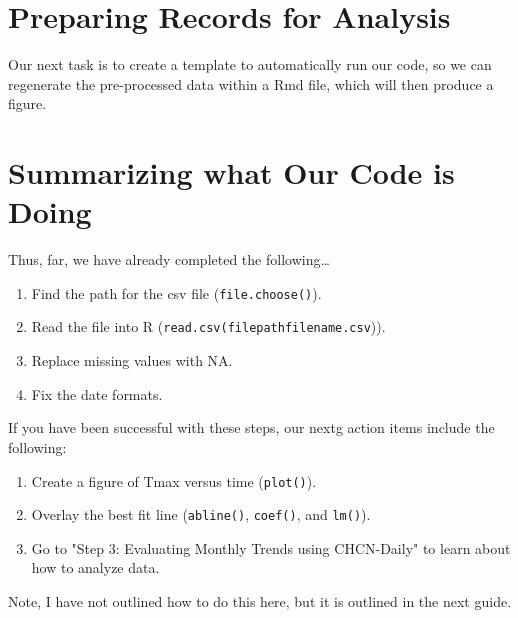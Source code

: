 \documentclass{article}\usepackage[]{graphicx}\usepackage[]{color}
\begin{document}





\section{Preparing Records for Analysis}

Our next task is to create a template to automatically run our code, so we can regenerate the pre-processed data within a Rmd file, which will then produce a figure. 

\section{Summarizing what Our Code is Doing}




Thus, far, we have already completed the following\ldots

\begin{enumerate}
  \item Find the path for the csv file (\texttt{file.choose()}).
  \item Read the file into R (\texttt{read.csv(filepathfilename.csv})).
  \item Replace missing values with NA.
  \item Fix the date formats.
\end{enumerate}


\noindent If you have been successful with these steps, our nextg action items include the following: 

\begin{enumerate}
  \item Create a figure of Tmax versus time (\texttt{plot()}).
  \item Overlay the best fit line (\texttt{abline()}, \texttt{coef()}, and \texttt{lm()}).
  \item Go to "Step 3: Evaluating Monthly Trends using CHCN-Daily" to learn about how to analyze data.
\end{enumerate}

Note, I have not outlined how to do this here, but it is outlined in the next guide. 
\end{document}
